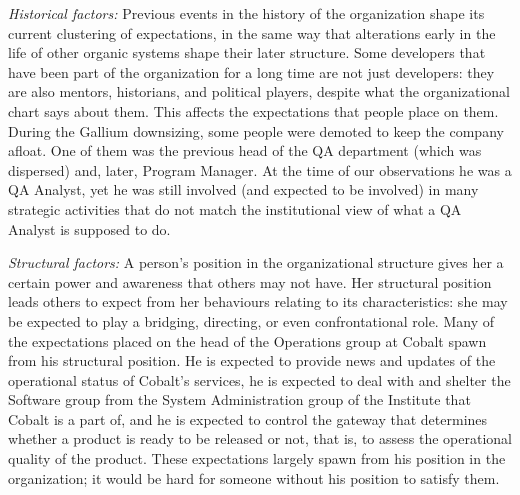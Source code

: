 \documentclass[10pt, conference, compsocconf]{IEEEtran}
\begin{document}
\emph{Historical factors:} Previous events in the history of the organization shape its current clustering of expectations, in the same way that alterations early in the life of other organic systems shape their later structure. Some developers that have been part of the organization for a long time are not just developers: they are also mentors, historians, and political players, despite what the organizational chart says about them. This affects the expectations that people place on them. During the Gallium downsizing, some people were demoted to keep the company afloat. One of them was the previous head of the QA department (which was dispersed) and, later, Program Manager. At the time of our observations he was a QA Analyst, yet he was still involved (and expected to be involved) in many strategic activities that do not match the institutional view of what a QA Analyst is supposed to do.

\emph{Structural factors:} A person's position in the organizational structure gives her a certain power and awareness that others may not have. Her structural position leads others to expect from her behaviours relating to its characteristics: she may be expected to play a bridging, directing, or even confrontational role. Many of the expectations placed on the head of the Operations group at Cobalt spawn from his structural position. He is expected to provide news and updates of the operational status of Cobalt's services, he is expected to deal with and shelter the Software group from the System Administration group of the Institute that Cobalt is a part of, and he is expected to control the gateway that determines whether a product is ready to be released or not, that is, to assess the operational quality of the product. These expectations largely spawn from his position in the organization; it would be hard for someone without his position to satisfy them.
\end{document}
